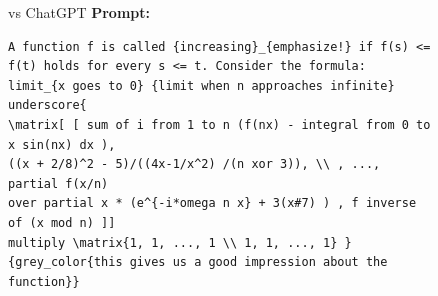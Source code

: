\begin{figure}[H]
\begin{AIbox}{\DV vs ChatGPT}
{\bf Prompt:}
\begin{verbatim}
A function f is called {increasing}_{emphasize!} if f(s) <= f(t) holds for every s <= t. Consider the formula:
limit_{x goes to 0} {limit when n approaches infinite} underscore{ 
\matrix[ [ sum of i from 1 to n (f(nx) - integral from 0 to x sin(nx) dx ),  
((x + 2/8)^2 - 5)/((4x-1/x^2) /(n xor 3)), \\ , ..., partial f(x/n)
over partial x * (e^{-i*omega n x} + 3(x#7) ) , f inverse of (x mod n) ]]
multiply \matrix{1, 1, ..., 1 \\ 1, 1, ..., 1} }
{grey_color{this gives us a good impression about the function}}


\end{verbatim}
\end{AIbox}
\end{figure}
